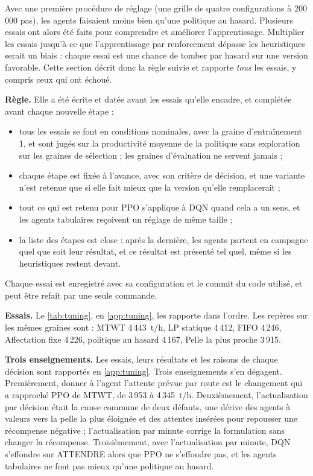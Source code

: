 \documentclass[11pt,a4paper]{article}
\newif\ifrevmarks
\newcommand{\revtag}[1]{\ifrevmarks\textsuperscript{\textcolor{red!70!black}{\scriptsize[#1]}}\fi}
\newenvironment{revbloc}[1]{\par\ifrevmarks\color{revcolor}\noindent\revtag{#1}\ \fi}{\par}
\newif\ifcorrmarks
\newcommand{\corr}[1]{\ifcorrmarks\textcolor{corrcolor}{#1}\else#1\fi}
\newenvironment{corrbloc}{\par\ifcorrmarks\color{corrcolor}\fi}{\par}
\begin{document}
\begin{revbloc}{M7, M12, v3}
Avec une première procédure de réglage (une grille de quatre configurations à 200\,000 pas), les agents faisaient moins bien qu'une politique au hasard. Plusieurs essais ont alors été faits pour comprendre et améliorer l'apprentissage. Multiplier les essais jusqu'à ce que l'apprentissage par renforcement dépasse les heuristiques serait un biais : chaque essai est une chance de tomber par hasard sur une version favorable. Cette section décrit donc la règle suivie et rapporte \emph{tous} les essais, y compris ceux qui ont échoué.

\textbf{Règle.} Elle a été écrite et datée avant les essais qu'elle encadre, et complétée avant chaque nouvelle étape :
\begin{itemize}
  \item tous les essais se font en conditions nominales, avec la graine d'entraînement 1, et sont jugés sur la productivité moyenne de la politique sans exploration sur les graines de sélection ; les graines d'évaluation ne servent jamais ;
  \item chaque étape est fixée à l'avance, avec son critère de décision, et une variante n'est retenue que si elle fait mieux que la version qu'elle remplacerait ;
  \item tout ce qui est retenu pour PPO s'applique à DQN quand cela a un sens, et les agents tabulaires reçoivent un réglage de même taille ;
  \item la liste des étapes est close : après la dernière, les agents partent en campagne quel que soit leur résultat, et ce résultat est présenté tel quel, même si les heuristiques restent devant.
\end{itemize}
Chaque essai est enregistré avec sa configuration et le commit du code utilisé, et peut être refait par une seule commande.

\textbf{Essais.} Le \cref{tab:tuning}\corr{, en \cref{app:tuning},} les rapporte dans l'ordre. Les repères sur les mêmes graines sont : MTWT 4\,443~t/h, \corr{LP statique} 4\,412, FIFO 4\,246, Affectation fixe 4\,226, politique au hasard 4\,167, Pelle la plus proche 3\,915.
\end{revbloc}

\begin{corrbloc}
\textbf{Trois enseignements.} Les essais, leurs résultats et les raisons de chaque décision sont rapportés en \cref{app:tuning}. Trois enseignements s'en dégagent. Premièrement, donner à l'agent l'attente prévue par route est le changement qui a rapproché PPO de MTWT, de 3\,953 à 4\,345~t/h. Deuxièmement, l'actualisation par décision était la cause commune de deux défauts, une dérive des agents à valeurs vers la pelle la plus éloignée et des attentes insérées pour repousser une récompense négative ; l'actualisation par minute corrige la formulation sans changer la récompense. Troisièmement, avec l'actualisation par minute, DQN s'effondre sur ATTENDRE alors que PPO ne s'effondre pas, et les agents tabulaires ne font pas mieux qu'une politique au hasard.
\end{corrbloc}
\end{document}
